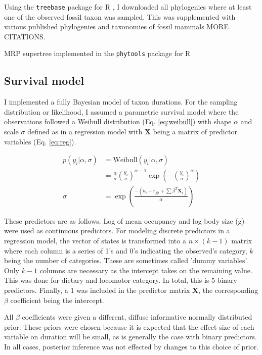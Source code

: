 \documentclass[12pt,letterpaper]{article}
\begin{document}
Using the \texttt{treebase} package for R \citep{boettiger2014treebase}, I downloaded all phylogenies where at least one of the observed fossil taxon was sampled. This was supplemented with various published phylogenies and taxonomies of fossil mammals \citep{Raia2012f,Janis1998,Janis2008} MORE CITATIONS.


MRP supertree implemented in the \texttt{phytools} package for R \citep{revell2012phytools}


\subsection{Survival model}

I implemented a fully Bayesian model of taxon durations. For the sampling distribution or likelihood, I assumed a parametric survival model where the observations followed a Weibull distribution (Eq. \ref{eq:weibull}) with shape \(\alpha\) and scale \(\sigma\) defined as in a regression model with \(\mathbf{X}\) being a matrix of predictor variables (Eq. \ref{eq:reg}).

\begin{align}
  p(y_{i}|\alpha, \sigma) &= \mathrm{Weibull}(y_{i}|\alpha, \sigma) \nonumber \\ 
  &= \frac{\alpha}{\sigma} \left(\frac{y_{i}}{\sigma}\right)^{\alpha - 1} \exp\left(-\left(\frac{y_{i}}{\sigma}\right)^{\alpha}\right) \label{eq:weibull}\\
  \sigma &= \exp\left(\frac{-(h_{i} + r_{j | i} + \sum \beta^{T} \mathbf{X}_{i})}{\alpha}\right) \label{eq:reg}
\end{align}

These predictors are as follows. Log of mean occupancy and log body size (g) were used as continuous predictors. For modeling discrete predictors in a regression model, the vector of states is transformed into a \(n \times (k - 1)\) matrix where each column is a series of 1's and 0's indicating the observed's category, \(k\) being the number of categories. These are sometimes called 'dummy variables'. Only \(k - 1\) columns are necessary as the intercept takes on the remaining value. This was done for dietary and locomotor category. In total, this is 5 binary predictors. Finally, a 1 was included in the predictor matrix \(\mathbf{X}\), the corresponding \(\beta\) coefficient being the intercept.

All \(\beta\) coefficients were given a different, diffuse informative normally distributed prior. These priors were chosen because it is expected that the effect size of each variable on duration will be small, as is generally the case with binary predictors. In all cases, posterior inference was not effected by changes to this choice of prior.
\end{document}

